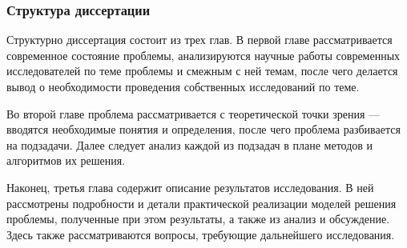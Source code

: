 \subsubsection{Структура диссертации}
Структурно диссертация состоит из трех глав. В первой главе рассматривается современное состояние проблемы, анализируются
научные работы современных исследователей по теме проблемы и смежным с ней темам, после чего делается вывод о необходимости
проведения собственных исследований по теме.

Во второй главе проблема рассматривается с теоретической точки зрения --- вводятся необходимые понятия и определения, после чего
проблема разбивается на подзадачи. Далее следует анализ каждой из подзадач в плане методов и алгоритмов их решения.

Наконец, третья глава содержит описание результатов исследования. В ней рассмотрены подробности и детали практической реализации
моделей решения проблемы, полученные при этом результаты, а также из анализ и обсуждение. Здесь также рассматриваются вопросы,
требующие дальнейшего исследования.
